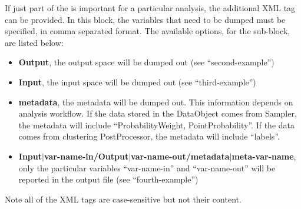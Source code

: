 If just part of the  is important for a particular analysis, the
additional XML tag  can be provided.
%
In this block, the variables that need to be dumped must be specified, in
comma separated format.
%
The available options, for the  sub-block, are listed below:
\vspace{-5mm}
\begin{itemize}
  \itemsep0em
  \item \textbf{Output}, the output space will be dumped out (see
  ``second-example'')
  \item \textbf{Input}, the input space will be dumped out (see
  ``third-example'')
  \item \textbf{metadata}, the metadata will be dumped out. This information
  depends on analysis workflow. If the data stored in the DataObject comes from Sampler,
  the metadata will include ``ProbabilityWeight, PointProbability''. If the data comes from
  clustering PostProcessor, the metadata will include ``labels''.
  \item \textbf{Input$|$var-name-in/Output$|$var-name-out/metadata$|$meta-var-name}, only the particular
  variables ``var-name-in'' and ``var-name-out'' will be reported in the output
  file (see ``fourth-example'')
\end{itemize}
\vspace{-5mm}
Note all of the XML tags are case-sensitive but not their content.

